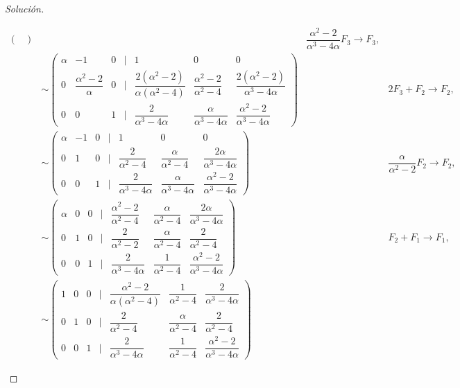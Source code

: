 \documentclass[a4,11pt]{aleph-notas}
\begin{document}
\begin{proof}[Solución]
\begin{enumerate}
\begin{align*}
\begin{pmatrix}
            \end{pmatrix} && \dfrac{\alpha^2-2}{\alpha^3-4\alpha} F_3 \rightarrow F_3, \\
            & \sim \begin{pmatrix}
                \alpha & -1 & 0 & | & 1 & 0 & 0 \\
                0 & \dfrac{\alpha^2-2}{\alpha} & 0 & | & \dfrac{2(\alpha^2-2)}{\alpha(\alpha^2-4)} & \dfrac{\alpha^2-2}{\alpha^2-4} & \dfrac{2(\alpha^2-2)}{\alpha^3-4\alpha}\\
                0 & 0 & 1 & | & \dfrac{2}{\alpha^3-4\alpha} & \dfrac{\alpha}{\alpha^3-4\alpha} & \dfrac{\alpha^2-2}{\alpha^3-4\alpha}
            \end{pmatrix} &&  2 F_3 + F_2 \rightarrow F_2, \\
            & \sim \begin{pmatrix}
                \alpha & -1 & 0 & | & 1 & 0 & 0 \\
                0 & 1 & 0 & | & \dfrac{2}{\alpha^2-4} & \dfrac{\alpha}{\alpha^2-4} & \dfrac{2\alpha}{\alpha^3-4\alpha}\\
                0 & 0 & 1 & | & \dfrac{2}{\alpha^3-4\alpha} & \dfrac{\alpha}{\alpha^3-4\alpha} & \dfrac{\alpha^2-2}{\alpha^3-4\alpha}
            \end{pmatrix} && \dfrac{\alpha}{\alpha^2-2}F_2 \rightarrow F_2, \\
            & \sim \begin{pmatrix}
                \alpha & 0 & 0 & | & \dfrac{\alpha^2-2}{\alpha^2-4} & \dfrac{\alpha}{\alpha^2-4} & \dfrac{2\alpha}{\alpha^3-4\alpha}\\
                0 & 1 & 0 & | & \dfrac{2}{\alpha^2-2} & \dfrac{\alpha}{\alpha^2-4} & \dfrac{2}{\alpha^2-4}\\
                0 & 0 & 1 & | & \dfrac{2}{\alpha^3-4\alpha} & \dfrac{1}{\alpha^2-4} & \dfrac{\alpha^2-2}{\alpha^3-4\alpha}
            \end{pmatrix} && F_2 + F_1 \rightarrow F_1, \\
            & \sim \begin{pmatrix}
                1 & 0 & 0 & | & \dfrac{\alpha^2-2}{\alpha(\alpha^2-4)} & \dfrac{1}{\alpha^2-4} & \dfrac{2}{\alpha^3-4\alpha}\\
                0 & 1 & 0 & | & \dfrac{2}{\alpha^2-4} & \dfrac{\alpha}{\alpha^2-4} & \dfrac{2}{\alpha^2-4}\\
                0 & 0 & 1 & | & \dfrac{2}{\alpha^3-4\alpha} & \dfrac{1}{\alpha^2-4} & \dfrac{\alpha^2-2}{\alpha^3-4\alpha}

\end{pmatrix}
\end{align*}
\end{enumerate}
\end{proof}
\end{document}

